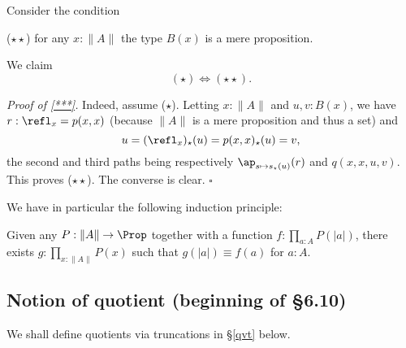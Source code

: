 \documentclass[12pt]{article}
\begin{document}
Consider the condition

\nn($\star\star$) for any $x:\lVert A\rVert$ the type $B(x)$ is a mere proposition.

We claim
\begin{equation}\label{***}
(\star)\iff(\star\star).
\end{equation}

\nn\emph{Proof of \eqref{***}.} Indeed, assume ($\star$). Letting $x:\lVert A\rVert$ and $u,v:B(x)$, we have $r:\refl_x=p(x,x)$ (because $\lVert A\rVert$ is a mere proposition and thus a set) and 
$$
u=(\refl_x)_\star(u)=p(x,x)_\star(u)=v,
$$ 
the second and third paths being respectively $\ap_{s\mapsto s_\star(u)}(r)$ and $q(x,x,u,v)$. This proves ($\star\star$). The converse is clear. $\square$

We have in particular the following induction principle:

Given any $P:\lVert A\rVert\to\Prop$ together with a function $f:\prod_{a:A}P(\lvert a\rvert)$, there exists $g:\prod_{x:\lVert A\rVert}P(x)$ such that $g(\lvert a\rvert)\equiv f(a)$ for $a:A$.


\subsection{Notion of quotient (beginning of \S6.10)}\label{610}

We shall define quotients via truncations in \S\ref{qvt} below.

\begin{comment}

To spell out the induction principle for the quotient $A/R$, let $\alpha(a,b):q(a)=q(b)$ be the path given from $q(a)$ to $q(b)$ whenever $R(a,b)$. 

Given $P:A/R\to\Set$ together with $f:\prod_{a:A}\ P(q(a))$ and 
$$
\beta(a,b):f(a)=^P_{\alpha(a,b)}f(b)
$$ 
for all $a,b$ such that $R(a,b)$, we have a $g:\prod_{x:A/R}P(x)$ such that $g(q(a))\equiv f(a)$ for all $a:A$, and $\apd_g(\alpha(a,b))=\beta(a,b)$ for all $a,b$ such that $R(a,b)$.

It is easy to see that if our type family $P:A/R\to\Set$ is such that $P(q(b))$ is a mere proposition whenever $R(a,b)$, and if we are just given an $f:\prod_{a:A}P(q(a))$, then we get a $g:\prod_{x:A/R}P(x)$ such that $g(q(a))\eq f(a)$ for all $a:A$.

\end{comment}

\end{document}
